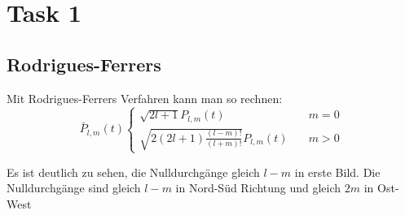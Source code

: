 \documentclass[12pt]{article}
\begin{document}
	\pagestyle{main}
\tableofcontents
\newpage
\section{Task 1}
\subsection{Rodrigues-Ferrers}
Mit Rodrigues-Ferrers Verfahren kann man so rechnen:
\begin{equation*}
\bar{P}_{l,m}(t)\begin{cases}
\sqrt{2l+1}P_{l,m}(t) \quad &m=0 \\
\sqrt{2(2l+1)\frac{(l-m)!}{(l+m)!}} P_{l,m}(t) \quad &m>0
\end{cases}
\end{equation*}
\begin{figure}[ht]\centering
\end{figure}
\newline
Es ist deutlich zu sehen, die Nulldurchgänge gleich $l - m$ in erste Bild. Die Nulldurchgänge sind gleich $l - m$ in Nord-Süd Richtung und gleich $2m$ in Ost-West\newpage
\end{document}
